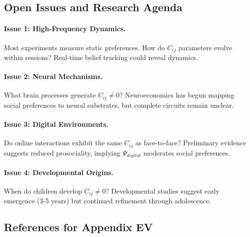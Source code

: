 
\subsection{Open Issues and Research Agenda}
\label{sec:EV-openissues}

\paragraph{Issue 1: High-Frequency Dynamics.}
Most experiments measure static preferences. How do $C_{ij}$ parameters
evolve within sessions? Real-time belief tracking could reveal dynamics.

\paragraph{Issue 2: Neural Mechanisms.}
What brain processes generate $C_{ij} \neq 0$? Neuroeconomics has begun
mapping social preferences to neural substrates, but complete circuits
remain unclear.

\paragraph{Issue 3: Digital Environments.}
Do online interactions exhibit the same $C_{ij}$ as face-to-face?
Preliminary evidence suggests reduced prosociality, implying $\Psi_{digital}$
moderates social preferences.

\paragraph{Issue 4: Developmental Origins.}
When do children develop $C_{ij} \neq 0$? Developmental studies suggest
early emergence (3-5 years) but continued refinement through adolescence.


\subsection{References for Appendix EV}
\label{sec:EV-references}

